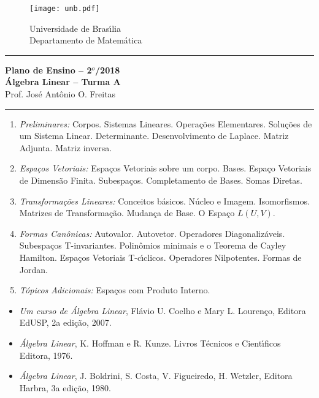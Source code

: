 \documentclass[12pt]{article}
\begin{document}
\pagestyle{empty}

\begin{figure}[h]
    \begin{minipage}[c]{1.7cm}
    \texttt{[image: unb.pdf]}
    \end{minipage}%
    \hspace{0pt}
    \begin{minipage}[c]{4in}
    {Universidade de Bras{{\'\i}}lia} \\
    {Departamento de Matem\'atica}
    \end{minipage}
\end{figure}
\vspace{-0.9cm}
\hrule

\begin{center}
{\large\bf Plano de Ensino -- 2$^{o}$/2018} \\
{\large\bf \'Algebra Linear -- Turma A}\\
Prof. Jos\'e Ant\^onio O. Freitas
\end{center}
\hrule
\vspace{0.25cm}
\begin{enumerate}[1)]
\item \textit{Preliminares:} Corpos. Sistemas Lineares. Opera\c{c}\~oes Elementares. Solu\c{c}\~oes de um Sistema Linear. Determinante. Desenvolvimento de Laplace. Matriz Adjunta. Matriz inversa.

\item \textit{Espa\c{c}os Vetoriais:} Espa\c{c}os Vetoriais sobre um corpo. Bases. Espa\c{c}o Vetoriais de Dimens\~ao Finita. Subespa\c{c}os. Completamento de Bases. Somas Diretas.


\item \textit{Transforma\c{c}\~oes Lineares:} Conceitos b\'asicos. N\'ucleo e Imagem. Isomorfismos. Matrizes de Transforma\c{c}\~ao. Mudan\c{c}a de Base. O Espa\c{c}o $L(U,V)$.

\item \textit{Formas Can\^onicas:} Autovalor. Autovetor. Operadores Diagonaliz\'aveis. Subespa\c{c}os T-invariantes. Polin\^omios minimais e o Teorema de Cayley Hamilton. Espa\c{c}os Vetoriais T-c{\'\i}clicos. Operadores Nilpotentes. Formas de Jordan.

\item \textit{T\'opicos Adicionais:} Espa\c{c}os com Produto Interno.

\end{enumerate}

\begin{itemize}
 \item \textit{Um curso de \'Algebra Linear}, Fl\'avio U. Coelho e Mary L. Louren\c{c}o,  Editora EdUSP, 2a edi\c{c}\~ao, 2007. 

\item \textit{\'Algebra Linear}, K. Hoffman e R. Kunze. Livros T\'ecnicos e Cient{\'\i}ficos Editora, 1976.

\item \textit{\'Algebra Linear}, J. Boldrini, S. Costa, V. Figueiredo, H. Wetzler, Editora Harbra, 3a edi\c{c}\~ao, 1980.

\end{itemize}
\end{document}
